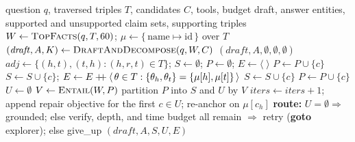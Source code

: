 \begin{algorithm}[!tb]
  \caption{Structural verification of a draft}
  \label{alg:verify}
  \begin{algorithmic}[1]
    \REQUIRE question $q$, traversed triples $T$, candidates $C$, tools, budget
    \ENSURE draft, answer entities, supported and unsupported claim sets,
      supporting triples
    \STATE $W \gets \textsc{TopFacts}(q, T, 60)$;\quad
      $\mu \gets \{\,\text{name} \mapsto \text{id}\,\}$ over $T$
    \STATE $(\mathit{draft}, A, K) \gets \textsc{DraftAndDecompose}(q, W, C)$
      \RETURN $(\mathit{draft}, A, \emptyset, \emptyset, \emptyset)$
    \ENDIF
    \STATE $\mathit{adj} \gets \{(h,t),(t,h) : (h,r,t) \in T\}$;\quad
      $S \gets \emptyset$;\; $P \gets \emptyset$;\;
      $E \gets \langle\;\rangle$ 
        \STATE $P \gets P \cup \{c\}$ 
        \STATE $S \gets S \cup \{c\}$;\quad
          $E \gets E \mathbin{+\mkern-6mu+} \langle\,\theta \in T :
          \{\theta_h,\theta_t\} = \{\mu[h],\mu[t]\}\,\rangle$
        \STATE $S \gets S \cup \{c\}$ 
      \ELSE
        \STATE $P \gets P \cup \{c\}$
      \ENDIF
    \ENDFOR
    \STATE $U \gets \emptyset$
      \STATE $V \gets \textsc{Entail}(W, P)$ 
      \STATE partition $P$ into $S$ and $U$ by $V$
    \ENDIF
      \STATE $\mathit{iters} \gets \mathit{iters} + 1$; append repair objective
        for the first $c \in U$; re-anchor on $\mu[c_h]$
    \ENDIF
    \STATE \textbf{route:} $U = \emptyset \Rightarrow$ \textsf{grounded};
      else verify, depth, and time budget all remain $\Rightarrow$
      \textsf{retry} (\textbf{goto} explorer); else \textsf{give\_up}
    \RETURN $(\mathit{draft}, A, S, U, E)$
  \end{algorithmic}
\end{algorithm}

